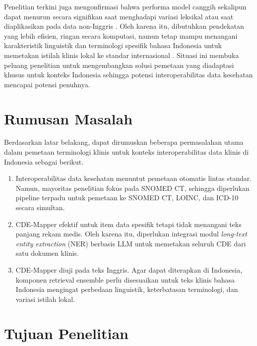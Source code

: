 Penelitian terkini juga mengonfirmasi bahwa performa model canggih sekalipun dapat menurun secara signifikan saat menghadapi variasi leksikal atau saat diaplikasikan pada data non-Inggris \citep{gallifant_language_2024,michel-picque_classifier_2024,rouhizadeh_large_2025}. Oleh karena itu, dibutuhkan pendekatan yang lebih efisien, ringan secara komputasi, namun tetap mampu menangani karakteristik linguistik dan terminologi spesifik bahasa Indonesia untuk memetakan istilah klinis lokal ke standar internasional \citep{gehrmann_catnip_2025,huh_comparative_2025}. Situasi ini membuka peluang penelitian untuk mengembangkan solusi pemetaan yang diadaptasi khusus untuk konteks Indonesia sehingga potensi interoperabilitas data kesehatan mencapai potensi penuhnya.

\section{Rumusan Masalah}

Berdasarkan latar belakang, dapat dirumuskan beberapa permasalahan utama dalam pemetaan terminologi klinis untuk konteks interoperabilitas data klinis di Indonesia sebagai berikut.

\begin{enumerate}
    \item Interoperabilitas data kesehatan menuntut pemetaan otomatis lintas standar. Namun, mayoritas penelitian fokus pada SNOMED CT, sehingga diperlukan pipeline terpadu untuk pemetaan ke SNOMED CT, LOINC, dan ICD-10 secara simultan.
    \item CDE-Mapper \citep{gilani_cde-mapper_2025} efektif untuk item data spesifik tetapi tidak menangani teks panjang rekam medis. Oleh karena itu, diperlukan integrasi modul \textit{long-text entity extraction} (NER) berbasis LLM untuk memetakan seluruh CDE dari satu dokumen klinis.
    \item CDE-Mapper diuji pada teks Inggris. Agar dapat diterapkan di Indonesia, komponen retrieval ensemble perlu disesuaikan untuk teks klinis bahasa Indonesia mengingat perbedaan linguistik, keterbatasan terminologi, dan variasi istilah lokal.
\end{enumerate}

\section{Tujuan Penelitian}

